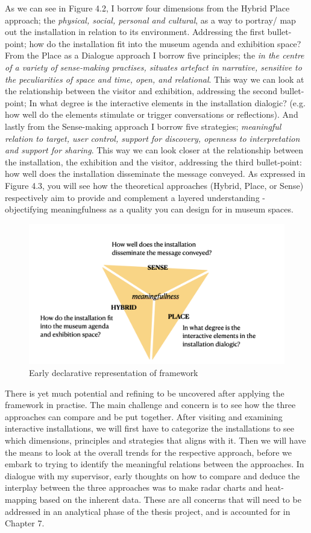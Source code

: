 As we can see in Figure 4.2, I borrow four dimensions from the Hybrid Place approach; the \emph{physical, social, personal and cultural}, as a way to portray/ map out the installation in relation to its environment. Addressing the first bullet-point; how do the installation fit into the museum agenda and exhibition space? From the Place as a Dialogue approach I borrow five principles; the \emph{in the centre of a variety of sense-making practises, situates artefact in narrative, sensitive to the peculiarities of space and time, open, and relational}. This way we can look at the relationship between the visitor and exhibition, addressing the second bullet-point; In what degree is the interactive elements in the installation dialogic? (e.g. how well do the elements stimulate or trigger conversations or reflections). And lastly from the Sense-making approach I borrow five strategies; \emph{meaningful relation to target, user control, support for discovery, openness to interpretation and support for sharing}. This way we can look closer at the relationship between the installation, the exhibition and the visitor, addressing the third bullet-point: how well does the installation disseminate the message conveyed. As expressed in Figure 4.3, you will see how the theoretical approaches (Hybrid, Place, or Sense) respectively aim to provide and complement a layered understanding - objectifying meaningfulness as a quality you can design for in museum spaces.

\begin{figure}[H]
\centering
\includegraphics[width=12.5cm]{pictures/Theory/triangle_explicit.png}
\caption{Early declarative representation of framework}
\end{figure}

There is yet much potential and refining to be uncovered after applying the framework in practise. The main challenge and concern is to see how the three approaches can compare and be put together. After visiting and examining interactive installations, we will first have to categorize the installations to see which dimensions, principles and strategies that aligns with it. Then we will have the means to look at the overall trends for the respective approach, before we embark to trying to identify the meaningful relations between the approaches. In dialogue with my supervisor, early thoughts on how to compare and deduce the interplay between the three approaches was to make radar charts and heat-mapping based on the inherent data. These are all concerns that will need to be addressed in an analytical phase of the thesis project, and is accounted for in Chapter 7. 

